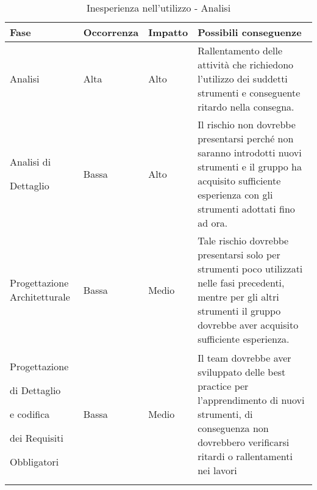 \documentclass[../PianoProgetto.tex]{subfiles}
\begin{document}
	\hspace{0pt}
		\begin{longtabu} to \textwidth {X[.55] X[c .50] X[c .50] X}
			\toprule
			\textbf{Fase} & \textbf{Occorrenza} & \textbf{Impatto} & \textbf{Possibili conseguenze}\\
			\midrule
			\endhead
			
			Analisi & Alta & Alto & Rallentamento delle attività che richiedono l'utilizzo dei suddetti strumenti e conseguente ritardo nella consegna. \\
			\midrule
			Analisi di \par Dettaglio & Bassa & Alto & Il rischio non dovrebbe presentarsi perché non saranno introdotti nuovi strumenti e il gruppo ha acquisito sufficiente esperienza con gli strumenti adottati fino ad ora. \\
			\midrule
			Progettazione Architetturale & Bassa &  Medio & Tale rischio dovrebbe presentarsi solo per strumenti poco utilizzati nelle fasi precedenti, mentre per gli altri strumenti il gruppo dovrebbe aver acquisito sufficiente esperienza. \\
			\midrule
			Progettazione \par di Dettaglio \par e codifica \par dei Requisiti \par Obbligatori & Bassa & Medio & Il team dovrebbe aver sviluppato delle best practice per l'apprendimento di nuovi strumenti, di conseguenza non dovrebbero verificarsi ritardi o rallentamenti nei lavori\\
			\bottomrule
			
			\caption{Inesperienza nell'utilizzo - Analisi}
			\label{tab:Inesperienza nell'utilizzo - Analisi}	
		\end{longtabu}
			
\end{document}
